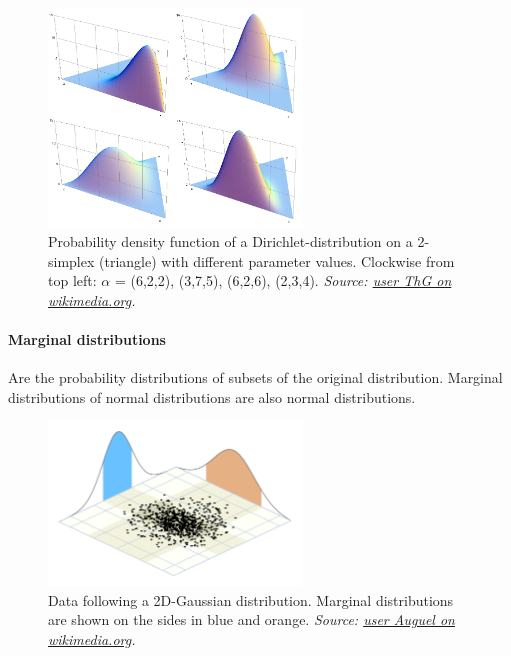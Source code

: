\documentclass[
]{book}
\begin{document}
\begin{figure}
\centering
\includegraphics[width=0.6\textwidth,height=\textheight]{./figures/Dirichlet_distributions.png}
\caption{Probability density function of a Dirichlet-distribution on a
2-simplex (triangle) with different parameter values. Clockwise from top
left: \(\alpha\) = (6,2,2), (3,7,5), (6,2,6), (2,3,4). \emph{Source: \href{https://commons.wikimedia.org/wiki/File:Dirichlet_distributions.png}{user ThG
on
wikimedia.org}.}}
\end{figure}

\hypertarget{marginal-distributions}{%
\paragraph{Marginal distributions}\label{marginal-distributions}}

Are the probability distributions of subsets of the original
distribution. Marginal distributions of normal distributions are also
normal distributions.

\begin{figure}
\centering
\includegraphics[width=0.6\textwidth,height=\textheight]{./figures/Multivariate_gaussian.png}
\caption{Data following a 2D-Gaussian distribution. Marginal distributions are
shown on the sides in blue and orange. \emph{Source: \href{https://commons.wikimedia.org/wiki/File:Multivariate_Gaussian_inequality_demonstration.svg}{user Auguel on
wikimedia.org}.}}
\end{figure}
\end{document}
